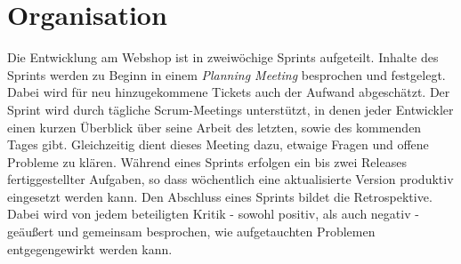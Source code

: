 \section{Organisation}
Die Entwicklung am Webshop ist in zweiwöchige Sprints aufgeteilt. Inhalte des Sprints werden zu Beginn in einem \textit{Planning Meeting} besprochen und festgelegt.
Dabei wird für neu hinzugekommene Tickets auch der Aufwand abgeschätzt. Der Sprint wird durch tägliche Scrum-Meetings unterstützt, in denen jeder Entwickler einen 
kurzen Überblick über seine Arbeit des letzten, sowie des kommenden Tages gibt. Gleichzeitig dient dieses Meeting dazu, etwaige Fragen und offene Probleme zu klären.
Während eines Sprints erfolgen ein bis zwei Releases fertiggestellter Aufgaben, so dass wöchentlich eine aktualisierte Version produktiv eingesetzt werden kann.
Den Abschluss eines Sprints bildet die Retrospektive. Dabei wird von jedem beteiligten Kritik - sowohl positiv, als auch negativ - geäußert und gemeinsam
besprochen, wie aufgetauchten Problemen entgegengewirkt werden kann.